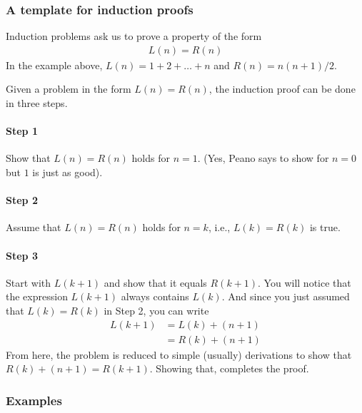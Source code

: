 \documentclass[letterpaper,10pt,english]{sphinxmanual}
\begin{document}
\subsubsection{A template for induction proofs}
\label{\detokenize{COMP163/notes/induction:a-template-for-induction-proofs}}
Induction problems ask us to prove a property of the form
\begin{equation*}
\begin{split}L(n) = R(n)\end{split}
\end{equation*}
In the example above, \(L(n)= 1+2+\ldots+n\) and \(R(n)=n(n+1)/2\).

Given a problem in the form \(L(n)=R(n)\), the induction proof can be done in three steps.


\paragraph{Step 1}
\label{\detokenize{COMP163/notes/induction:step-1}}
Show that \(L(n)=R(n)\) holds for \(n=1\). (Yes, Peano says to show for \(n=0\) but \(1\) is just as good).


\paragraph{Step 2}
\label{\detokenize{COMP163/notes/induction:step-2}}
Assume that \(L(n)=R(n)\) holds for \(n=k\), i.e., \(L(k)=R(k)\) is true.


\paragraph{Step 3}
\label{\detokenize{COMP163/notes/induction:step-3}}
Start with \(L(k+1)\) and show that it equals \(R(k+1)\). You will notice that the expression   \(L(k+1)\) always contains \(L(k)\). And since you just assumed that \(L(k)=R(k)\) in Step 2, you can write
\begin{equation*}
\begin{split}L(k+1) &= L(k) + (n+1) \\
&= R(k) + (n+1)\end{split}
\end{equation*}
From here, the problem is reduced to simple (usually) derivations to show that
\(R(k) + (n+1) = R(k+1)\). Showing that, completes the proof.


\subsubsection{Examples}
\label{\detokenize{COMP163/notes/induction:examples}}
\end{document}
